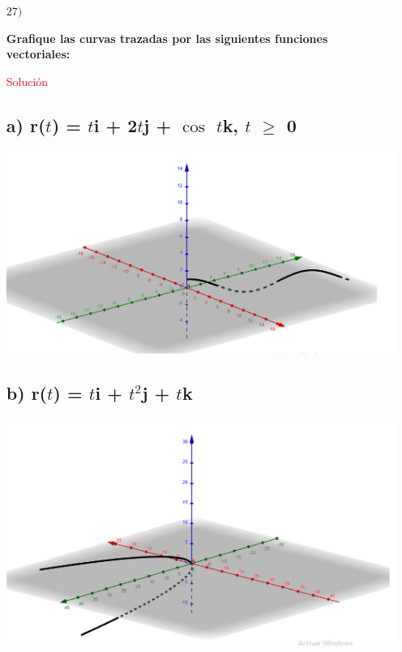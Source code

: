 \documentclass[12pt, letter-paper]{article}
\begin{document}
\begin{enumerate}
    \item [$27)$]
    \normalsize{\textbf{Grafique las curvas trazadas por las siguientes funciones vectoriales:}\par}
    \large{\textcolor{red}{Solución}\par}
    \vspace{0.5cm}
    \subsection*{a) r($t$) = $t$i + 2$t$j + $\cos$ $t$k,  $t$ $\geq$ 0 }
    \includegraphics[width=.95\textwidth]{Imag/27-a.png}
    \subsection*{b) r($t$) = $t$i + $t^2$j + $t$k}
    \includegraphics[width=.95\textwidth]{Imag/27-b.png}

\end{enumerate}
\end{document}
